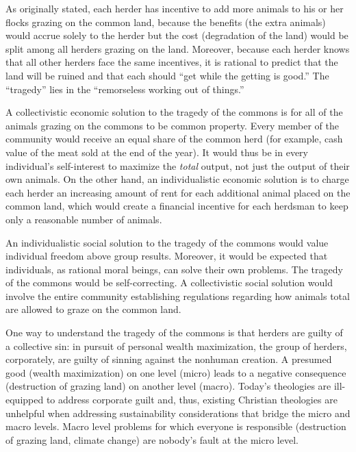 \documentclass[12pt]{article}
\begin{document}
As originally stated, each herder has incentive 
to add more animals to his or her flocks grazing on the common land, because
the benefits (the extra animals) would accrue solely to the herder
but the cost (degradation of the land) 
would be split among all herders grazing on the land. 
Moreover, because each herder knows that all other herders face the same incentives, 
it is rational to predict that the land will be ruined
and that each should ``get while the getting is good.''
The ``tragedy'' lies in the ``remorseless working out of things.''

A collectivistic economic solution to the tragedy of the commons 
is for all of the animals grazing on the commons to be common property. 
Every member of the community would receive an equal share of the common herd 
(for example, cash value of the meat sold at the end of the year). 
It would thus be in every individual's self-interest 
to maximize the \emph{total} output, 
not just the output of their own animals. 
On the other hand, 
an individualistic economic solution is to charge each herder an increasing amount of rent 
for each additional animal placed on the common land, 
which would create a financial incentive for each herdsman to keep
only a reasonable number of animals. 

An individualistic social solution to the tragedy of the commons 
would value individual freedom above group results.
Moreover, it would be expected that individuals, as rational moral beings,
can solve their own problems. The tragedy of the commons would be self-correcting.
A collectivistic social solution would involve 
the entire community establishing 
regulations regarding how animals total are allowed to graze on the common land.

One way to understand the tragedy of the commons
is that herders are guilty of a collective sin:
in pursuit of personal wealth maximization, 
the group of herders, corporately, are guilty of sinning against the nonhuman creation.
A presumed good (wealth maximization) on one level (micro)
leads to a negative consequence (destruction of grazing land) on another level (macro).
Today's theologies are ill-equipped to address corporate guilt
and, thus, existing Christian theologies are unhelpful 
when addressing sustainability considerations that bridge the micro and macro levels.
Macro level problems for which everyone is responsible 
(destruction of grazing land, climate change)
are nobody's fault at the micro level.


\end{document}
